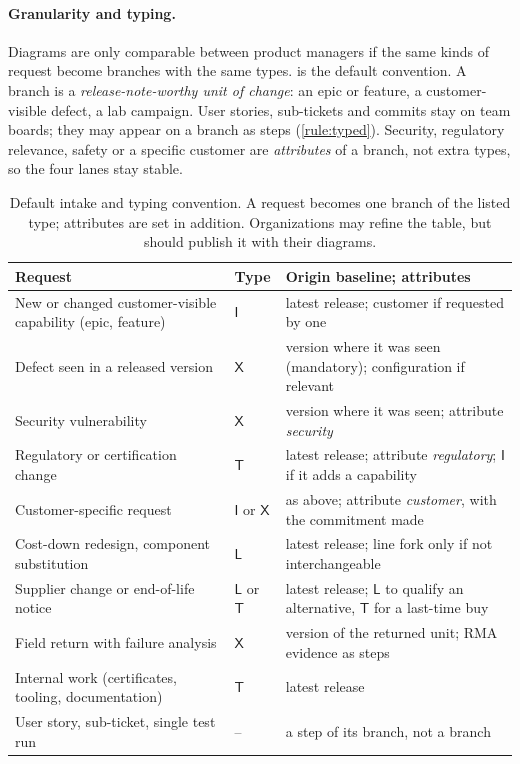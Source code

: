 \paragraph{Granularity and typing.}
Diagrams are only comparable between product managers if the same kinds
of request become branches with the same types.  is the
default convention. A branch is a \emph{release-note-worthy unit of
change}: an epic or feature, a customer-visible defect, a lab campaign.
User stories, sub-tickets and commits stay on team boards; they may
appear on a branch as steps (\cref{rule:typed}). Security, regulatory
relevance, safety or a specific customer are \emph{attributes} of a
branch, not extra types, so the four lanes stay stable.

\begin{table}[tbp]
  \centering
  \small
  \caption{Default intake and typing convention. A request becomes one
    branch of the listed type; attributes are set in addition.
    Organizations may refine the table, but should publish it with their
    diagrams.}
  \label{tab:intake}
  \begin{tabularx}{\linewidth}{@{}>{\raggedright\arraybackslash}X
                                  >{\centering\arraybackslash}p{1.0cm}
                                  >{\raggedright\arraybackslash}p{5.6cm}@{}}
    \toprule
    \textbf{Request} & \textbf{Type} & \textbf{Origin baseline; attributes} \\
    \midrule
    New or changed customer-visible capability (epic, feature) & $\mathsf{I}$ & latest release; customer if requested by one \\
    Defect seen in a released version & $\mathsf{X}$ & version where it was seen (mandatory); configuration if relevant \\
    Security vulnerability & $\mathsf{X}$ & version where it was seen; attribute \emph{security} \\
    Regulatory or certification change & $\mathsf{T}$ & latest release; attribute \emph{regulatory}; $\mathsf{I}$ if it adds a capability \\
    Customer-specific request & $\mathsf{I}$ or $\mathsf{X}$ & as above; attribute \emph{customer}, with the commitment made \\
    Cost-down redesign, component substitution & $\mathsf{L}$ & latest release; line fork only if not interchangeable \\
    Supplier change or end-of-life notice & $\mathsf{L}$ or $\mathsf{T}$ & latest release; $\mathsf{L}$ to qualify an alternative, $\mathsf{T}$ for a last-time buy \\
    Field return with failure analysis & $\mathsf{X}$ & version of the returned unit; RMA evidence as steps \\
    Internal work (certificates, tooling, documentation) & $\mathsf{T}$ & latest release \\
    User story, sub-ticket, single test run & -- & a step of its branch, not a branch \\
    \bottomrule
  \end{tabularx}
\end{table}

